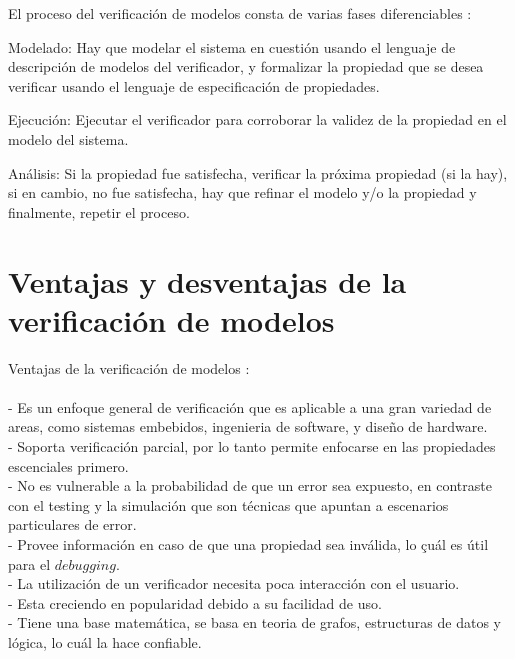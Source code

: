 El proceso del verificación de modelos consta de varias fases diferenciables \cite{Baier:2}:

Modelado: Hay que modelar el sistema en cuestión usando el lenguaje de descripción de modelos del verificador, y formalizar la propiedad que se desea verificar usando el lenguaje de especificación de propiedades.

Ejecución: Ejecutar el verificador para corroborar la validez de la propiedad en el modelo del sistema.

Análisis: Si la propiedad fue satisfecha, verificar la próxima propiedad (si la hay), si en cambio, no fue satisfecha, hay que refinar el modelo y/o la propiedad y finalmente, repetir el proceso.

\section{Ventajas y desventajas de la verificación de modelos}
Ventajas de la verificación de modelos \cite{Baier:2}:\\
\\
- Es un enfoque general de verificación que es aplicable a una gran variedad de areas, como sistemas embebidos, ingenieria de software, y diseño de hardware.\\
- Soporta verificación parcial, por lo tanto permite enfocarse en las propiedades escenciales primero.\\
- No es vulnerable a la probabilidad de que un error sea expuesto, en contraste con el testing y la simulación que son técnicas que apuntan a escenarios particulares de error.\\
- Provee información en caso de que una propiedad sea inválida, lo çuál es útil para el $debugging$.\\
- La utilización de un verificador necesita poca interacción con el usuario.\\
- Esta creciendo en popularidad debido a su facilidad de uso.\\
- Tiene una base matemática, se basa en teoria de grafos, estructuras de datos y lógica, lo cuál la hace confiable.\\

